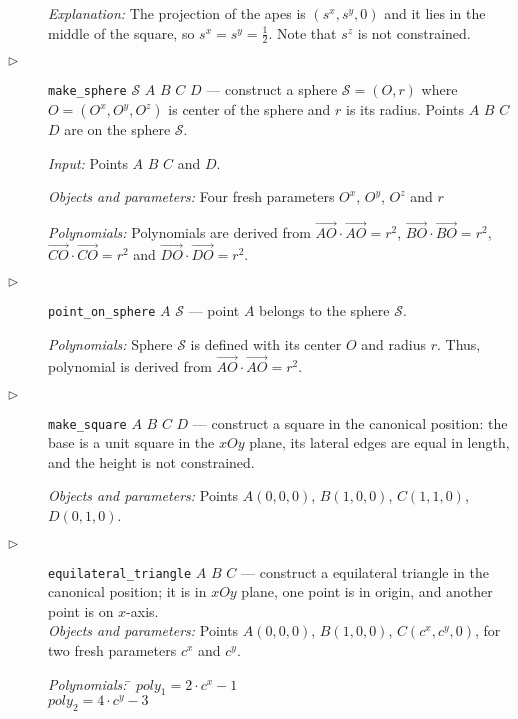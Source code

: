 \documentclass[final,1p,times,authoryear]{elsarticle}
\begin{document}
\begin{description}
{\em Explanation:} The projection of the apes is $(s^x, s^y, 0)$ and
it lies in the middle of the square, so $s^x = s^y =
\frac{1}{2}$. Note that $s^z$ is not constrained.


\item[$\triangleright$] {\tt make\_sphere} $\mathcal{S}$ $A$ $B$ $C$
  $D$ --- construct a sphere $\mathcal{S} = (O, r)$ where $O = (O^x,
  O^y, O^z)$ is center of the sphere and $r$ is its radius. Points $A$
  $B$ $C$ $D$ are on the sphere $\mathcal{S}$.
  
  {\em Input:} Points $A$ $B$ $C$ and $D$.

  {\em Objects and parameters:} Four fresh
  parameters $O^x$, $O^y$, $O^z$ and $r$

{\em Polynomials:} Polynomials are derived from
$\overrightarrow{AO}\cdot\overrightarrow{AO} = r^2$,
$\overrightarrow{BO}\cdot\overrightarrow{BO} = r^2$,
$\overrightarrow{CO}\cdot\overrightarrow{CO} = r^2$ and
$\overrightarrow{DO}\cdot\overrightarrow{DO} = r^2$.

\item[$\triangleright$] {\tt point\_on\_sphere} $A$ $\mathcal{S}$ --- point $A$
  belongs to the sphere $\mathcal{S}$.

{\em Polynomials:} Sphere $\mathcal{S}$ is defined with its center $O$
and radius $r$. Thus, polynomial is derived from
$\overrightarrow{AO}\cdot\overrightarrow{AO} = r^2$.


\item[$\triangleright$] {\tt make\_square} $A$ $B$ $C$ $D$ ---
  construct a square in the canonical position: the base is a unit
  square in the $xOy$ plane, its lateral edges are equal in length,
  and the height is not constrained.

  {\em Objects and parameters:} Points $A(0, 0, 0)$, $B(1, 0, 0)$,
  $C(1, 1, 0)$, $D(0, 1, 0)$.

\item[$\triangleright$] {\tt equilateral\_triangle} $A$ $B$ $C$ ---
  construct a equilateral triangle in the canonical position; it is in
  $xOy$ plane, one point is in origin, and another point is on
  $x$-axis. \\
  {\em Objects and parameters:} Points $A(0, 0, 0)$, $B(1, 0, 0)$,
  $C(c^x, c^y, 0)$, for two fresh parameters $c^x$ and $c^y$.

\begin{tabbing}
{\em Polynomials:} \= $poly_1 = 2\cdot c^x - 1$ \\
                   \> $poly_2 = 4\cdot c^y - 3$
\end{tabbing}



\end{description}
\end{document}
